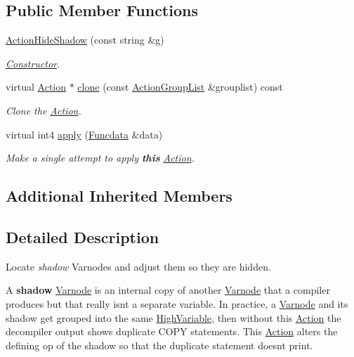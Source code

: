 \subsection*{Public Member Functions}
\begin{DoxyCompactItemize}
\item 
\mbox{\hyperlink{class_action_hide_shadow_aaaee5d4c8b0ef3ef8556606312c680f4}{Action\+Hide\+Shadow}} (const string \&g)
\begin{DoxyCompactList}\small\item\em \mbox{\hyperlink{class_constructor}{Constructor}}. \end{DoxyCompactList}\item 
virtual \mbox{\hyperlink{class_action}{Action}} $\ast$ \mbox{\hyperlink{class_action_hide_shadow_a5b763cb14e0381b879231c4922d00f5b}{clone}} (const \mbox{\hyperlink{class_action_group_list}{Action\+Group\+List}} \&grouplist) const
\begin{DoxyCompactList}\small\item\em Clone the \mbox{\hyperlink{class_action}{Action}}. \end{DoxyCompactList}\item 
virtual int4 \mbox{\hyperlink{class_action_hide_shadow_a2f3d4cba003d9e55f07c2754280caf22}{apply}} (\mbox{\hyperlink{class_funcdata}{Funcdata}} \&data)
\begin{DoxyCompactList}\small\item\em Make a single attempt to apply {\bfseries{this}} \mbox{\hyperlink{class_action}{Action}}. \end{DoxyCompactList}\end{DoxyCompactItemize}
\subsection*{Additional Inherited Members}


\subsection{Detailed Description}
Locate {\itshape shadow} Varnodes and adjust them so they are hidden. 

A {\bfseries{shadow}} \mbox{\hyperlink{class_varnode}{Varnode}} is an internal copy of another \mbox{\hyperlink{class_varnode}{Varnode}} that a compiler produces but that really isn\textquotesingle{}t a separate variable. In practice, a \mbox{\hyperlink{class_varnode}{Varnode}} and its shadow get grouped into the same \mbox{\hyperlink{class_high_variable}{High\+Variable}}, then without this \mbox{\hyperlink{class_action}{Action}} the decompiler output shows duplicate C\+O\+PY statements. This \mbox{\hyperlink{class_action}{Action}} alters the defining op of the shadow so that the duplicate statement doesn\textquotesingle{}t print. 

